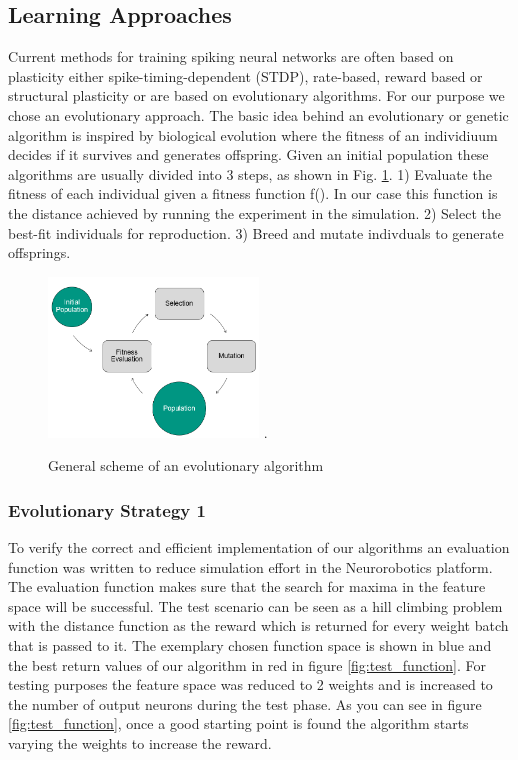 \subsection{Learning Approaches}
Current methods for training spiking neural networks are often based on plasticity either spike-timing-dependent (STDP), rate-based, reward based or structural plasticity or are based on evolutionary algorithms. %
 For our purpose we chose an evolutionary approach. The basic idea behind an evolutionary or genetic algorithm is inspired by biological evolution where the fitness of an individiuum decides if it survives and generates offspring. Given an initial population these algorithms are usually divided into 3 steps, as shown in Fig. \ref{evo_base}. 1) Evaluate the fitness of each individual given a fitness function f(). In our case this function is the distance achieved by running the experiment in the simulation. 2) Select the best-fit individuals for reproduction. 3) Breed and mutate indivduals to generate offsprings.

\begin{figure}[H]
	\centering
	\includegraphics[width=2.2in]{img/evo_base.png}
	\DeclareGraphicsExtensions.
	\caption{General scheme of an evolutionary algorithm}
	\label{evo_base}
\end{figure}

\subsubsection{Evolutionary Strategy 1}
To verify the correct and efficient implementation of our algorithms an evaluation function was written to reduce simulation effort in the Neurorobotics platform. The evaluation function makes sure that the search for maxima in the feature space will be successful. The test scenario can be seen as a hill climbing problem with the distance function as the reward which is returned for every weight batch that is passed to it. The exemplary chosen function space is shown in blue and the best return values of our algorithm in red in figure \ref{fig:test_function}. For testing purposes the feature space was reduced to 2 weights and is increased to the number of output neurons during the test phase.
As you can see in figure \ref{fig:test_function}, once a good starting point is found the algorithm starts varying the weights to increase the reward. 


